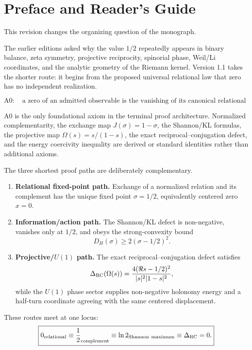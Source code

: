 \chapter*{Preface and Reader's Guide}

This revision changes the organizing question of the monograph.

The earlier editions asked why the value \(1/2\) repeatedly appears in binary
balance, zeta symmetry, projective reciprocity, spinorial phase, Weil/Li
coordinates, and the analytic geometry of the Riemann kernel.  Version 1.1 takes the shorter route: it begins from the proposed universal relational law
that zero has no independent realization.

\[
\boxed{
\mathrm{A0}:\quad
\text{a zero of an admitted observable is the vanishing of its canonical
relational defect.}
}
\]

A0 is the only foundational axiom in the terminal proof architecture.
Normalized complementarity, the exchange map \(J(\sigma)=1-\sigma\), the
Shannon/KL formulas, the projective map \(\Omega(s)=s/(1-s)\), the exact
reciprocal--conjugation defect, and the energy coercivity inequality are
derived or standard identities rather than additional axioms.

The three shortest proof paths are deliberately complementary.

\begin{enumerate}
  \item \textbf{Relational fixed-point path.}
  Exchange of a normalized relation and its complement has the unique fixed
  point \(\sigma=1/2\), equivalently centered zero \(x=0\).

  \item \textbf{Information/action path.}
  The Shannon/KL defect is non-negative, vanishes only at \(1/2\), and obeys
  the strong-convexity bound
  \[
  D_H(\sigma)\ge2(\sigma-1/2)^2.
  \]

  \item \textbf{Projective/\(U(1)\) path.}
  The exact reciprocal--conjugation defect satisfies
  \[
  \Delta_{\rm RC}(\Omega(s))
  =
  \frac{4(\Re s-1/2)^2}{|s|^2|1-s|^2},
  \]
  while the \(U(1)\) phase sector supplies non-negative holonomy energy and a
  half-turn coordinate agreeing with the same centered displacement.
\end{enumerate}

These routes meet at one locus:
\[
\boxed{
0_{\rm relational}
\equiv
\frac12_{\rm complement}
\equiv
\ln2_{\rm Shannon\ maximum}
\equiv
\Delta_{\rm RC}=0.
}
\]

